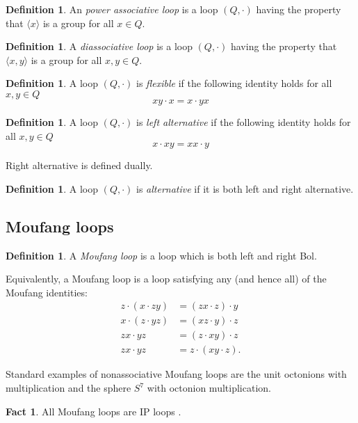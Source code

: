 \documentclass[12pt]{report}
\theoremstyle{definition}
\newtheorem{fct}[thm]{Fact}
\newtheorem{dfn}[thm]{Definition}
\begin{document}
\begin{dfn}
  An \emph{power associative loop} is a loop $(Q, \cdot)$ having the property that $\langle x\rangle$ is a group
    for all $x\in Q$.
\end{dfn}

\begin{dfn}
  A \emph{diassociative loop} is a loop $(Q, \cdot)$ having the property that $\langle x, y\rangle$ is a group
    for all $x, y\in Q$.
\end{dfn}

\begin{dfn}
  A loop $(Q, \cdot)$ is \emph{flexible} if the following identity holds for all $x, y\in Q$
  \[xy\cdot x = x\cdot yx\]
\end{dfn}

\begin{dfn}
  A loop $(Q, \cdot)$ is \emph{left alternative} if the following identity holds for all $x, y\in Q$
  \[x\cdot xy = xx\cdot y\]
\end{dfn}

Right alternative is defined dually.

\begin{dfn}
  A loop $(Q, \cdot)$ is \emph{alternative} if it is both left and right alternative.
\end{dfn}

\subsection{Moufang loops}

\begin{dfn}
  A \emph{Moufang loop} is a loop which is both left and right Bol.
\end{dfn}

Equivalently, a Moufang loop is a loop satisfying any (and hence all) of the Moufang identities:
  \begin{align*}
    z\cdot(x \cdot zy) &= (zx\cdot z)\cdot y\\
    x\cdot(z \cdot yz) &= (xz\cdot y)\cdot z\\
    zx\cdot yz &= (z\cdot xy)\cdot z\\
    zx\cdot yz &= z\cdot(xy\cdot z).
  \end{align*}

Standard examples of nonassociative Moufang loops are the unit octonions with multiplication and the sphere
  $S^7$ with octonion multiplication.

\begin{fct}
  All Moufang loops are IP loops \cite{Moufang}.
\end{fct}
\end{document}
